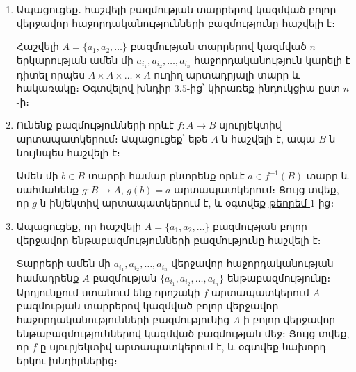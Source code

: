 \begin{enumerate}[label=\thesection.\arabic*.]
\begin{hint}
    Դիտարկեք  $A_1 \times A_2 \times \dots \times A_n = \bigcup\limits_{i} A_1 \times A_2 \times \dots \times A_{n-1} \times \{ b_{i} \} $  ներկայացումը, որտեղ $A_n = \{b_1, b_2, \dots \}$, և օգտվելով \hyperref[ch3thm4]{թեորեմ $3$}-ից՝ կիրառեք ինդուկցիա ըստ $n$-ի։
\end{hint}
 
\item Ապացուցեք․ հաշվելի բազմության տարրերով կազմված բոլոր վերջավոր հա\-ջոր\-դականությունների բազմությունը հաշվելի է։

\begin{hint}
    Հաշվելի $A = \{ a_1, a_2, \dots \}$ բազմության տարրերով կազմված $n$ երկարության ամեն մի $a_{i_{\scriptstyle 1}}, a_{i_{\scriptstyle 2}}, \dots, a_{i_{\scriptstyle n}}$ հաջորդականություն կարելի է դիտել որպես $A \times A \times  \dots \times A$ ուղիղ արտադրյալի տարր և հակառակը։ Օգտվելով խնդիր $3.5$-ից՝ կիրառեք ինդուկցիա ըստ $n$-ի։
\end{hint}

\item Ունենք բազմությունների որևէ $f : A \rightarrow B$ սյուրյեկտիվ արտապատկերում։ Ապացուցեք՝ եթե $A$-ն հաշվելի է, ապա $B$-ն նույնպես հաշվելի է։

\begin{hint}
    Ամեն մի $b \in B$ տարրի համար ընտրենք որևէ $a \in f^{-1}(B)$ տարր և սահմանենք $g : B \rightarrow A$, $g(b)=a$ արտապատկերում։
Ցույց տվեք, որ $g$-ն ինյեկտիվ արտապատկերում է, և օգտվեք \hyperref[ch3thm2]{թեորեմ $1$}-ից։
\end{hint}

\item Ապացուցեք, որ հաշվելի $A = \{a_1, a_2, \dots \}$ բազմության բոլոր վերջավոր ենթա\-բազմությունների բազմությունը հաշվելի է։

\begin{hint}
    Տարրերի ամեն մի $a_{i_{\scriptstyle 1}}, a_{i_{\scriptstyle 2}}, \dots , a_{i_{\scriptstyle n}}$ վերջավոր հաջորդականու\-թյան համադրենք $A$ բազմության $\{a_{i_{\scriptstyle 1}}, a_{i_{\scriptstyle 2}}, \dots , a_{i_{\scriptstyle n}}\}$ ենթաբազմությունը։
Արդյուն\-քում ստանում ենք որոշակի $f$ արտապատկերում $A$ բազմության տարրերով կազմված բոլոր վեր\-ջավոր հաջորդականությունների բազմությունից  $A$-ի \linebreak բոլոր վերջավոր ենթաբազմություններով կազմված բազմության մեջ։ Ցույց տվեք, որ $f$-ը սյուր\-յեկտիվ արտապատկերում է, և օգտվեք նախորդ երկու խնդիր\-ներից։
\end{hint}


\end{enumerate}
